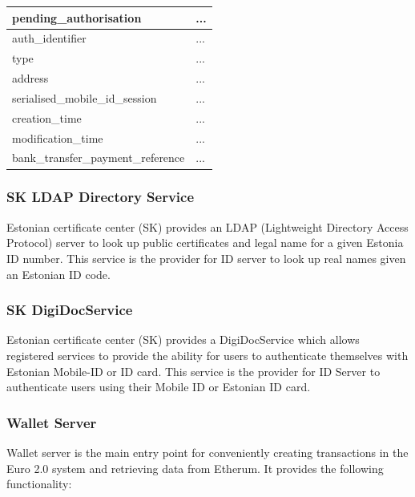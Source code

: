 \documentclass[12pt]{article} %
\begin{document}
{\begin{center}
\begin{tabular}{ | l | p{10cm} | }
 \hline
 \textbf{pending\_authorisation} & ...
 \\ \hline\hline
 auth\_identifier & ...
 \\ \hline
 type & ...
 \\ \hline
 address & ...
 \\ \hline
 serialised\_mobile\_id\_session & ...
 \\ \hline
 creation\_time & ...
 \\ \hline
 modification\_time & ...
 \\ \hline
 bank\_transfer\_payment\_reference & ...
 \\ \hline
\end{tabular}
\end{center}
\label{tab:idDatabasePendingAuthorization}

\subsubsection{SK LDAP Directory Service}

Estonian certificate center (SK)\cite{aboutSk2017} provides an LDAP (Lightweight Directory Access Protocol) server to look up public certificates and legal name for a given Estonia ID number\cite{skAboutLdap2017}\cite{skLdapTechnical2017}. This service is the provider for ID server to look up real names given an Estonian ID code.

\subsubsection{SK DigiDocService}

Estonian certificate center (SK) provides a DigiDocService which allows registered services to provide the ability for users to authenticate themselves with Estonian Mobile-ID or ID card\cite{skDigiDocService2017}. This service is the provider for ID Server to authenticate users using their Mobile ID or Estonian ID card.

\subsubsection{Wallet Server} \label{sssec:3.5:walletServer}

Wallet server is the main entry point for conveniently creating transactions in the Euro 2.0 system and retrieving data from Etherum. It provides the following functionality:

}
\end{document}
